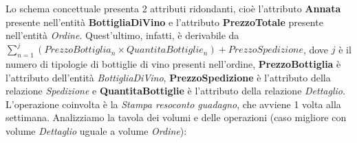 Lo schema concettuale presenta 2 attributi ridondanti, cioè l'attributo \textbf{Annata} presente nell'entità \textbf{BottigliaDiVino} e l'attributo \textbf{PrezzoTotale} presente nell'entità \emph{Ordine}. Quest'ultimo, infatti, è derivabile da $\sum_{n = 1}^{j} (PrezzoBottiglia_n \times QuantitaBottiglie_n) + PrezzoSpedizione$, 
dove $j$ è il numero di tipologie di bottiglie di vino presenti nell'ordine,
\textbf{PrezzoBottiglia} è l'attributo dell'entità \emph{BottigliaDiVino}, \textbf{PrezzoSpedizione} è l'attributo della relazione \emph{Spedizione} e \textbf{QuantitaBottiglie} è l'attributo della relazione \emph{Dettaglio}. L'operazione coinvolta è la \emph{Stampa resoconto guadagno}, che avviene 1 volta alla settimana. Analizziamo la tavola dei volumi e delle operazioni (caso migliore con volume \emph{Dettaglio} uguale a volume \emph{Ordine}):

